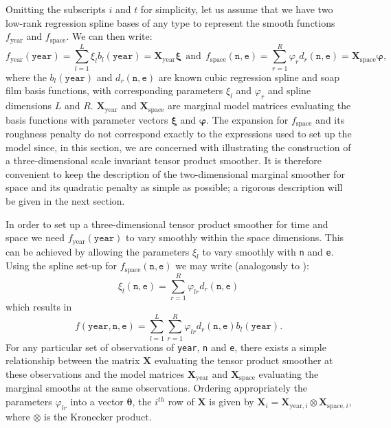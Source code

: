 Omitting the subscripts $i$ and $t$ for simplicity, let us assume that we have two low-rank regression spline bases of any type to represent the smooth functions $f_\text{year}$ and $f_\text{space}$. We can then write:
\begin{equation*}
f_\text{year}(\texttt{year})=\sum_{l=1}^L \xi_l b_l(\texttt{year})=\textbf{X}_\text{year}\bm\xi \ \ \text{and} \ \ f_\text{space}(\texttt{n},\texttt{e})=\sum_{r=1}^R \varphi_r d_r(\texttt{n},\texttt{e})=\textbf{X}_\text{space}\bm\varphi,
\end{equation*}
where the $b_l(\texttt{year})$ and $d_r(\texttt{n},\texttt{e})$ are known cubic regression spline and soap film basis functions, with corresponding parameters $\xi_l$ and $\varphi_r$ and spline dimensions $L$ and $R$. $\textbf{X}_\text{year}$ and $\textbf{X}_\text{space}$ are marginal model matrices evaluating the basis functions with parameter vectors $\bm\xi$ and $\bm\varphi$. The expansion for $f_\text{space}$ and its roughness penalty do not correspond exactly to the expressions used to set up the model since, in this section, we are concerned with illustrating the construction of a three-dimensional scale invariant tensor product smoother. It is therefore convenient to keep the description of the two-dimensional marginal smoother for space and its quadratic penalty as simple as possible; a rigorous description will be given in the next section. 

In order to set up a three-dimensional tensor product smoother for time and space we need $f_\text{year}(\texttt{year})$ to vary smoothly within the space dimensions. This can be achieved by allowing the parameters $\xi_l$ to vary smoothly with \texttt{n} and \texttt{e}. Using the spline set-up for $f_\text{space}(\texttt{n},\texttt{e})$ we may write (analogously to ):
$$
\xi_l(\texttt{n},\texttt{e})=\sum_{r=1}^R \varphi_{lr} d_r(\texttt{n},\texttt{e})
$$    
which results in
$$
f(\texttt{year},\texttt{n},\texttt{e})=\sum_{l=1}^L \sum_{r=1}^R \varphi_{lr} d_r(\texttt{n},\texttt{e}) b_l(\texttt{year}). 
$$
For any particular set of observations of \texttt{year}, \texttt{n} and \texttt{e}, there exists a simple relationship between the matrix $\textbf{X}$ evaluating the tensor product smoother at these observations and the model matrices $\textbf{X}_\text{year}$ and $\textbf{X}_\text{space}$ evaluating the marginal smooths at the same observations. Ordering appropriately the parameters $\varphi_{lr}$ into a vector $\bm\theta$, the $i^{th}$ row of $\textbf{X}$ is given by $\textbf{X}_{i}=\textbf{X}_{\text{year},i}\otimes\textbf{X}_{\text{space},i}$, where $\otimes$ is the Kronecker product. 

